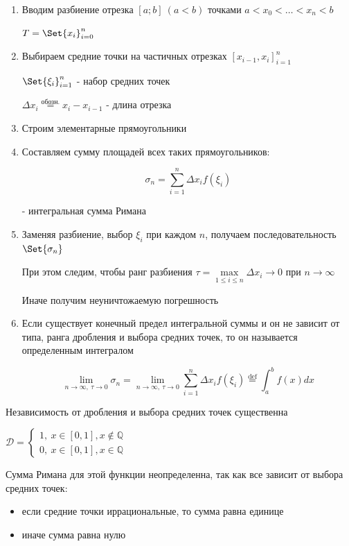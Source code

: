 \documentclass[12pt]{article}
\begin{document}
    \begin{enumerate}
        \item Вводим разбиение отрезка $[a; b]\ (a < b)$ точками $a < x_0 < \dots < x_n < b$

        $T = \Set{x_i}^n_{i=0}$

        \item Выбираем средние точки на частичных отрезках $[x_{i-1}, x_i]^n_{i=1}$

        $\Set{\xi_i}_{i=1}^n$ - набор средних точек

        $\Delta x_i \stackrel{\text{обозн.}}{=} x_i - x_{i-1}$ - длина отрезка

        \item Строим элементарные прямоугольники
        \item Составляем сумму площадей всех таких прямоугольников:

        \[\sigma_n = \sum^n_{i=1} \Delta x_i f(\xi_i)\]

        - интегральная сумма Римана

        \item Заменяя разбиение, выбор $\xi_i$ при каждом $n$, получаем последовательность $\Set{\sigma_n}$

        При этом следим, чтобы ранг разбиения $\tau = \max\limits_{1 \leq i \leq n} \Delta x_i \rightarrow 0$ при $n \to \infty$

        Иначе получим неуничтожаемую погрешность

        \item \Def Если существует конечный предел интегральной суммы и он не зависит от типа,
        ранга дробления и выбора средних точек, то он называется определенным интегралом

        \[\lim_{n\to\infty,\ \tau\to0} \sigma_n = \lim_{n\to\infty,\ \tau\to0} \sum^n_{i=1} \Delta x_i f(\xi_i) \stackrel{\text{def}}{=} \int_a^b f(x)dx\]

    \end{enumerate}

    \Nota Независимость от дробления и выбора средних точек существенна

    \Ex $\mathcal{D} = \begin{cases}
                           1,\ x \in [0, 1], x \not\in \mathbb{Q} \\ 0,\ x \in [0, 1], x \in \mathbb{Q}
    \end{cases}$

    Сумма Римана для этой функции неопределенна, так как все зависит от выбора средних точек:
    \begin{itemize}
        \item если средние точки иррациональные, то сумма равна единице
        \item иначе сумма равна нулю
    \end{itemize}
\end{document}
